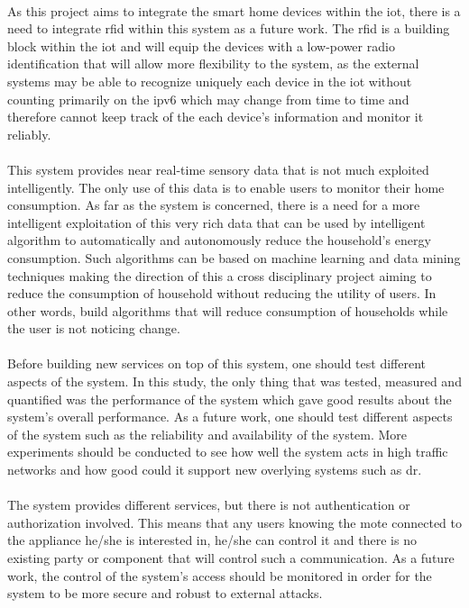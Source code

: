\documentclass[oneside,12pt,a4paper,final]{book}
\begin{document}
\paragraph{}
As this project aims to integrate the smart home devices within the \gls{iot}, there is a need to integrate \gls{rfid} within this system as a future work. The \gls{rfid} is a building block within the \gls{iot} and will equip the devices with a low-power radio identification that will allow more flexibility to the system, as the external systems may be able to recognize uniquely each device in the \gls{iot} without counting primarily on the \gls{ipv6} which may change from time to time and therefore cannot keep track of the each device's information and monitor it reliably.
\paragraph{}
This system provides near real-time sensory data that is not much exploited intelligently. The only use of this data is to enable users to monitor their home consumption. As far as the system is concerned, there is a need for a more intelligent exploitation of this very rich data that can be used by intelligent algorithm to automatically and autonomously reduce the household's energy consumption. Such algorithms can be based on machine learning and data mining techniques making the direction of this a cross disciplinary project aiming to reduce the consumption of household without reducing the utility of users. In other words, build algorithms that will reduce consumption of households while the user is not noticing change.
\paragraph{}
Before building new services on top of this system, one should test different aspects of the system. In this study, the only thing that was tested, measured and quantified was the performance of the system which gave good results about the system's overall performance. As a future work, one should test different aspects of the system such as the reliability and availability of the system. More experiments should be conducted to see how well the system acts in high traffic networks and how good could it support new overlying systems such as \gls{dr}.
\paragraph{}
The system provides different services, but there is not authentication or authorization involved. This means that any users knowing the mote connected to the appliance he/she is interested in, he/she can control it and there is no existing party or component that will control such a communication. As a future work, the control of the system's access should be monitored in order for the system to be more secure and robust to external attacks.
\end{document}
